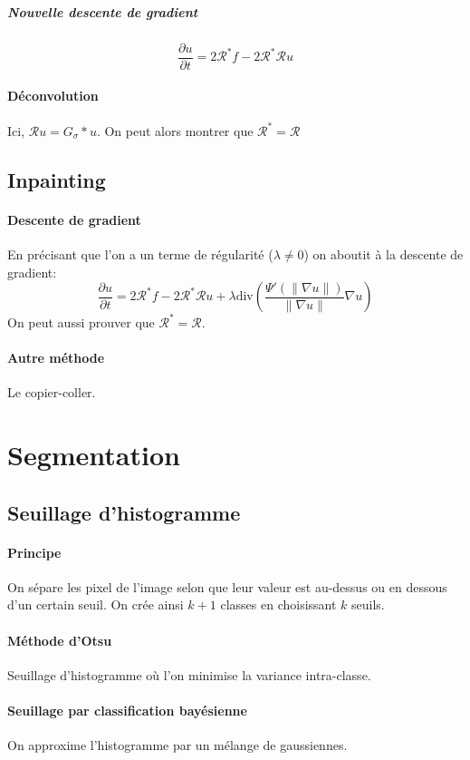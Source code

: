 \documentclass[french]{article}
\begin{document}
\subparagraph{Nouvelle descente de gradient}
$$\frac{\partial u}{\partial t} = 2\mathcal{R}^* f - 2 \mathcal{R}^*\mathcal{R} u$$

\paragraph{Déconvolution} Ici, $\mathcal{R} u = G_\sigma * u$. On peut alors
montrer que $\mathcal{R}^* = \mathcal{R}$

\subsection{Inpainting}
\paragraph{Descente de gradient} En précisant que l'on a un terme de régularité
($\lambda \neq 0$) on aboutit à la descente de gradient:
$$\frac{\partial u}{\partial t} = 2\mathcal{R}^* f - 2 \mathcal{R}^*\mathcal{R} u
+ \lambda \text{div}\left( \frac{\Psi'(\|\nabla u\|)}{\|\nabla u\|} \nabla u\right)$$
On peut aussi prouver que $\mathcal{R}^* = \mathcal{R}$.

\paragraph{Autre méthode} Le copier-coller.

\section{Segmentation}
\subsection{Seuillage d'histogramme}
\paragraph{Principe} On sépare les pixel de l'image selon que leur valeur
est au-dessus ou en dessous d'un certain seuil. On crée ainsi $k+1$ classes
en choisissant $k$ seuils.

\paragraph{Méthode d'Otsu} Seuillage d'histogramme où l'on minimise la
variance intra-classe.

\paragraph{Seuillage par classification bayésienne} On approxime
l'histogramme par un mélange de gaussiennes.
\end{document}
